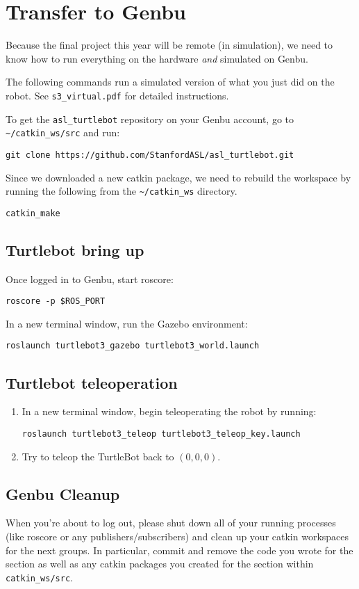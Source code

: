 \section{Transfer to Genbu}
Because the final project this year will be remote (in simulation), we need to know how to run everything on the hardware \textit{and} simulated on Genbu.

The following commands run a simulated version of what you just did on the robot. See \texttt{s3\_virtual.pdf} for detailed instructions.

To get the \texttt{asl\_turtlebot} repository on your Genbu account, go to \texttt{\textasciitilde/catkin\_ws/src} and run:

\begin{lstlisting}
git clone https://github.com/StanfordASL/asl_turtlebot.git
\end{lstlisting}

Since we downloaded a new catkin package, we need to rebuild the workspace by running the following from the \texttt{\textasciitilde/catkin\_ws} directory.

\begin{lstlisting}
catkin_make
\end{lstlisting}

\subsection{Turtlebot bring up}
Once logged in to Genbu, start roscore:

\begin{lstlisting}
roscore -p $ROS_PORT
\end{lstlisting}

In a new terminal window, run the Gazebo environment:

\begin{lstlisting}
roslaunch turtlebot3_gazebo turtlebot3_world.launch
\end{lstlisting}

\subsection{Turtlebot teleoperation}
\begin{enumerate}
\item In a new terminal window, begin teleoperating the robot by running:
\begin{lstlisting}
roslaunch turtlebot3_teleop turtlebot3_teleop_key.launch
\end{lstlisting}
\item Try to teleop the TurtleBot back to $(0,0,0)$.
\end{enumerate}

\subsection{Genbu Cleanup}

When you're about to log out, please shut down all of your running processes (like roscore or any publishers/subscribers) and clean up your catkin workspaces for the next groups. In particular, commit and remove the code you wrote for the section as well as any catkin packages you created for the section within \texttt{catkin\_ws/src}. 
